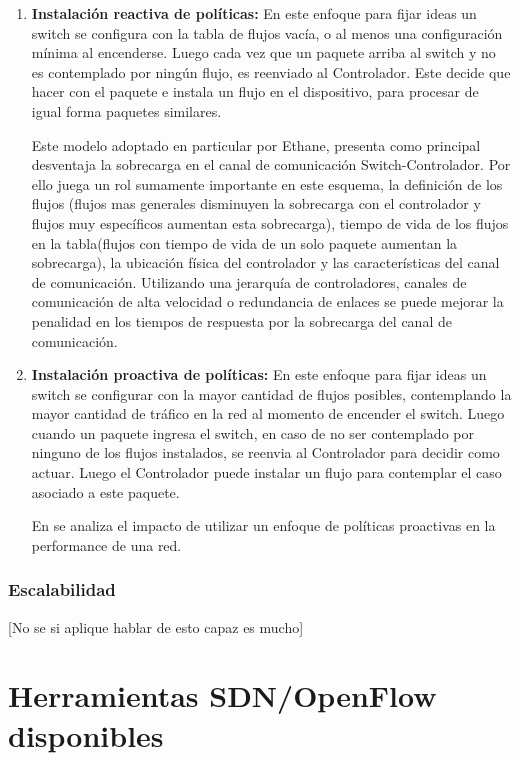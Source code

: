 \begin{enumerate}
\item \textbf{Instalación reactiva de políticas:} En este enfoque para fijar ideas un switch se configura con la tabla de flujos vac\'ia, o al menos una configuración mínima al encenderse. Luego cada vez que un paquete arriba al switch y no es contemplado por ning\'un flujo, es reenviado al Controlador. Este decide que hacer con el paquete e instala un flujo en el dispositivo, para procesar de igual forma paquetes similares.

Este modelo adoptado en particular por Ethane\cite{casado2007ethane}, presenta como principal desventaja la sobrecarga en el canal de comunicación Switch-Controlador. Por ello juega un rol sumamente importante en este esquema, la definición de los flujos (flujos mas generales disminuyen la sobrecarga con el controlador y flujos muy específicos aumentan esta sobrecarga), tiempo de vida de los flujos en la tabla(flujos con tiempo de vida de un solo paquete aumentan la sobrecarga), la ubicación física del controlador y las características del canal de comunicación. Utilizando una jerarquía de controladores, canales de comunicación de alta velocidad o redundancia de enlaces se puede mejorar la penalidad en los tiempos de respuesta por la sobrecarga del canal de comunicación. 

\item \textbf{Instalación proactiva de políticas:} En este enfoque para fijar ideas un switch se configurar con la mayor cantidad de flujos posibles, contemplando la mayor cantidad de tr\'afico en la red al momento de encender el switch. Luego cuando un paquete ingresa el switch, en caso de no ser contemplado por ninguno de los flujos instalados, se reenvia al Controlador para decidir como actuar. Luego el Controlador puede instalar un flujo para contemplar el caso asociado a este paquete. 

En \cite{yu2011scalable} se analiza el impacto de utilizar un enfoque de políticas proactivas en la performance de una red.  

\end{enumerate} 

\subsubsection{Escalabilidad}
[No se si aplique hablar de esto capaz es mucho]

\section{Herramientas SDN/OpenFlow disponibles}

